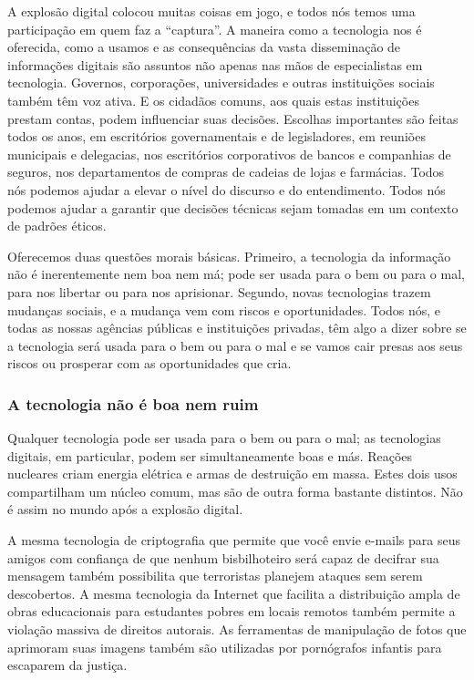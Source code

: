 A explosão digital colocou muitas coisas em jogo, e todos nós temos uma
participação em quem faz a ``captura''. A maneira como a tecnologia nos é
oferecida, como a usamos e as consequências da vasta disseminação de informações
digitais são assuntos não apenas nas mãos de especialistas em
tecnologia. Governos, corporações, universidades e outras instituições sociais
também têm voz ativa. E os cidadãos comuns, aos quais estas instituições prestam
contas, podem influenciar suas decisões. Escolhas importantes são feitas
todos os anos, em escritórios governamentais e de legisladores, em reuniões
municipais e delegacias, nos escritórios corporativos de bancos e companhias de
seguros, nos departamentos de compras de cadeias de lojas e farmácias. Todos nós
podemos ajudar a elevar o nível do discurso e do entendimento. Todos nós podemos
ajudar a garantir que decisões técnicas sejam tomadas em um contexto de padrões
éticos.

Oferecemos duas questões morais básicas. Primeiro, a tecnologia da informação
não é inerentemente nem boa nem má; pode ser usada para o bem ou para o mal,
para nos libertar ou para nos aprisionar. Segundo, novas tecnologias trazem
mudanças sociais, e a mudança vem com riscos e oportunidades. Todos nós, e todas
as nossas agências públicas e instituições privadas, têm algo a dizer sobre se a
tecnologia será usada para o bem ou para o mal e se vamos cair presas aos seus
riscos ou prosperar com as oportunidades que cria.

\subsubsection*{A tecnologia não é boa nem ruim}
\label{cap1:exp-dig-perigo:goodbad}
Qualquer tecnologia pode ser usada para o bem ou para o mal; as tecnologias
digitais, em particular, podem ser simultaneamente boas e más. Reações nucleares
criam energia elétrica e armas de destruição em massa. Estes dois usos
compartilham um núcleo comum, mas são de outra forma bastante distintos. Não é
assim no mundo após a explosão digital.

A mesma tecnologia de criptografia que permite que você envie e-mails para seus
amigos com confiança de que nenhum bisbilhoteiro será capaz de decifrar sua
mensagem também possibilita que terroristas planejem ataques sem serem
descobertos. A mesma tecnologia da Internet que facilita a distribuição ampla de
obras educacionais para estudantes pobres em locais remotos também permite a
violação massiva de direitos autorais. As ferramentas de manipulação de fotos
que aprimoram suas imagens também são utilizadas por pornógrafos infantis para
escaparem da justiça.

